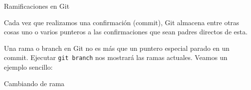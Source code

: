 \documentclass{beamer}
\begin{document}
\begin{frame}{Ramificaciones en Git}

    Cada vez que realizamos una confirmación (commit), Git almacena entre otras cosas uno o varios punteros a las confirmaciones que
    sean padres directos de esta.

    Una rama o branch en Git no es más que un puntero especial parado en un commit. Ejecutar \texttt{git branch} nos mostrará las ramas actuales. Veamos un ejemplo sencillo:


\end{frame}

\begin{frame}{Cambiando de rama}


\end{frame}
\end{document}
